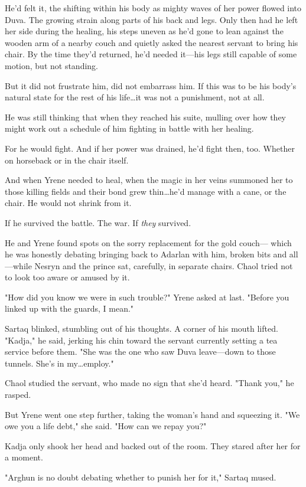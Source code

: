 He'd felt it, the shifting within his body as mighty waves of her power flowed into Duva.
The growing strain along parts of his back and legs.
Only then had he left her side during the healing, his steps uneven as he'd gone to lean against the wooden arm of a nearby couch and quietly asked the nearest servant to bring his chair.
By the time they'd returned, he'd needed it---his legs still capable of some motion, but not standing.

But it did not frustrate him, did not embarrass him.
If this was to be his body's natural state for the rest of his life\ldots it was not a punishment, not at all.

He was still thinking that when they reached his suite, mulling over how they might work out a schedule of him fighting in battle with her healing.

For he would fight.
And if her power was drained, he'd fight then, too.
Whether on horseback or in the chair itself.

And when Yrene needed to heal, when the magic in her veins summoned her to those killing fields and their bond grew thin\ldots he'd manage with a cane, or the chair.
He would not shrink from it.

If he survived the battle.
The war.
If \emph{they} survived.

He and Yrene found spots on the sorry replacement for the gold couch--- which he was honestly debating bringing back to Adarlan with him, broken bits and all---while Nesryn and the prince sat, carefully, in separate chairs.
Chaol tried not to look too aware or amused by it.

"How did you know we were in such trouble?"
Yrene asked at last.
"Before you linked up with the guards, I mean."

Sartaq blinked, stumbling out of his thoughts.
A corner of his mouth lifted.
"Kadja," he said, jerking his chin toward the servant currently setting a tea service before them.
"She was the one who saw Duva leave---down to those tunnels.
She's in my\ldots employ."

Chaol studied the servant, who made no sign that she'd heard.
"Thank you," he rasped.

But Yrene went one step further, taking the woman's hand and squeezing it.
"We owe you a life debt," she said.
"How can we repay you?"

Kadja only shook her head and backed out of the room.
They stared after her for a moment.

"Arghun is no doubt debating whether to punish her for it," Sartaq mused.


